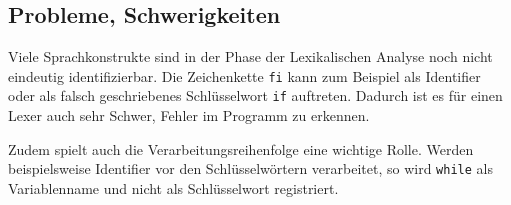 \subsection{Probleme, Schwerigkeiten}

Viele Sprachkonstrukte sind in der Phase der Lexikalischen Analyse noch nicht
eindeutig identifizierbar. Die Zeichenkette \texttt{fi} kann zum Beispiel als
Identifier oder als falsch geschriebenes Schlüsselwort \texttt{if} auftreten.
Dadurch ist es für einen Lexer auch sehr Schwer, Fehler im Programm zu erkennen.

Zudem spielt auch die Verarbeitungsreihenfolge eine wichtige Rolle. Werden
beispielsweise Identifier vor den Schlüsselwörtern verarbeitet, so wird
\texttt{while} als Variablenname und nicht als Schlüsselwort registriert.
